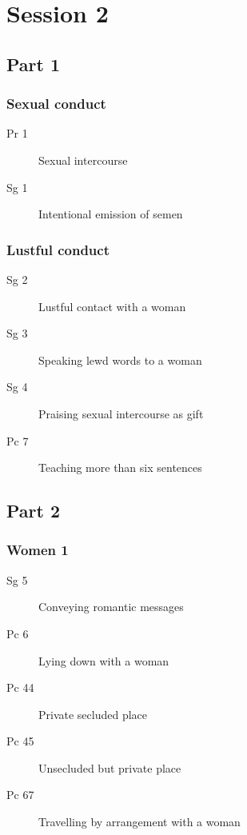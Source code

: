 \documentclass[11pt,oneside]{memoir}
\begin{document}
\chapter{Session 2}

\begin{multicols}{2}

\section{Part 1}

\subsection{Sexual conduct}

\begin{description}
\item[Pr 1] Sexual intercourse
\item[Sg 1] Intentional emission of semen
\end{description}

\subsection{Lustful conduct}

\begin{description}
\item[Sg 2] Lustful contact with a woman
\item[Sg 3] Speaking lewd words to a woman
\item[Sg 4] Praising sexual intercourse as gift
\item[Pc 7] Teaching more than six sentences
\end{description}

\columnbreak

\section{Part 2}

\subsection{Women 1}

\begin{description}
\item[Sg 5] Conveying romantic messages
\item[Pc 6] Lying down with a woman
\item[Pc 44] Private secluded place
\item[Pc 45] Unsecluded but private place
\item[Pc 67] Travelling by arrangement with a woman
\end{description}

\end{multicols}
\end{document}

